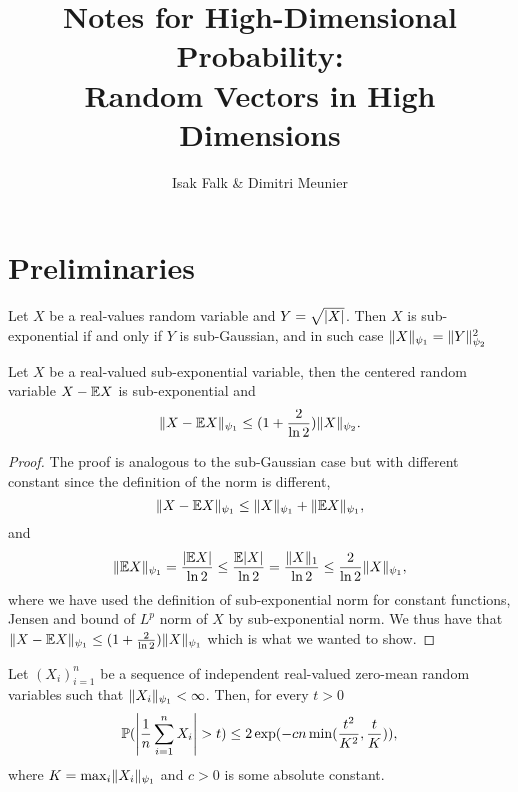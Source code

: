 \documentclass{article}
\title{Notes for High-Dimensional Probability:\\ Random Vectors in High Dimensions}
\author{%
  Isak Falk \& Dimitri Meunier
}
\begin{document}
\maketitle

\section{Preliminaries}

\begin{proposition}
  \label{prop:sub-gauss-sub-exp-norm-relation}
  Let \(X\) be a real-values random variable and \(Y = \sqrt{\abs{X}}\). Then
  \(X\) is sub-exponential if and only if \(Y\) is sub-Gaussian, and in such
  case \(\norm{X}_{\psi_{1}} = \norm{Y}_{\psi_{2}}^{2}\)
\end{proposition}

\begin{proposition}
  \label{prop:centering-of-sub-exp-rvs}
  Let \(X\) be a real-valued sub-exponential variable, then the centered random
  variable \(X - \E X\) is sub-exponential and
  \begin{equation}
    \norm{X - \E X}_{\psi_{1}} \leq (1 + \frac{2}{\ln 2}) \norm{X}_{\psi_{2}}.
  \end{equation}
\end{proposition}

\begin{proof}
  The proof is analogous to the sub-Gaussian case but with different constant
  since the definition of the norm is different,
  \begin{equation}
    \norm{X - \E X}_{\psi_{1}} \leq \norm{X}_{\psi_{1}} + \norm{\E X}_{\psi_{1}},
  \end{equation}
  and
  \begin{equation}
    \norm{\E X}_{\psi_{1}} = \frac{\abs{\E X}}{\ln 2} \leq \frac{\E \abs{X}}{\ln 2} = \frac{\norm{X}_{1}}{\ln 2} \leq \frac{2}{\ln 2}\norm{X}_{\psi_{1}},
  \end{equation}
  where we have used the definition of sub-exponential norm for constant
  functions, Jensen and bound of \(L^{p}\) norm of \(X\) by sub-exponential
  norm. We thus have that
  \(\norm{X - \E X}_{\psi_{1}} \leq (1 + \frac{2}{\ln 2})\norm{X}_{\psi_{1}}\)
  which is what we wanted to show.

\end{proof}

\begin{theorem}
  \label{thm:bernsteins-ineq}
  Let \((X_{i})_{i=1}^{n}\) be a sequence of independent real-valued zero-mean
  random variables such that \(\norm{X_{i}}_{\psi_{1}} < \infty\). Then, for
  every \(t > 0\)
  \begin{equation}
    \Pr(\abs*{\frac{1}{n}\sum_{i=1}^{n}X_{i}} > t) \leq 2\exp(-cn\min(\frac{t^{2}}{K^{2}}, \frac{t}{K})),
  \end{equation}
  where \(K = \max_{i}\norm{X_{i}}_{\psi_{1}}\) and \(c > 0\) is some absolute constant.
\end{theorem}
\end{document}
